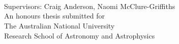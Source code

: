 
\begin{titlepage}
  \enlargethispage{2cm}
  \begin{center}
    \makeatletter
    {\Huge\textbf{\@title}} \\[.4cm]
    {\Huge\textbf{\thesisqualifier}} \\[.4cm]
    {\huge\textbf{\@author}} \\ [.4cm]
    {\Large Supervisors: Craig Anderson, Naomi McClure-Griffiths} \\[7cm]
    \makeatother
    {\Large An honours thesis submitted for \\
    The Australian National University \\
    Research School of Astronomy and Astrophysics}\\[2cm]
    {\LARGE \thismonth}
  \end{center}
\end{titlepage}
